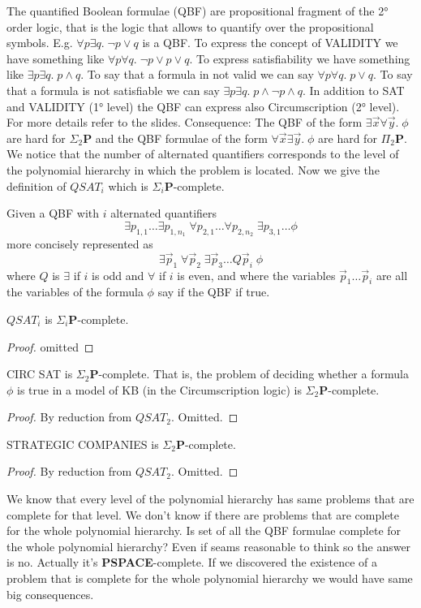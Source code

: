 The quantified Boolean formulae (QBF) are propositional fragment of the 2° order logic, that is the logic that allows to quantify over the propositional symbols. E.g. $\forall p \exists q.\; \neg p\lor q$ is a QBF. To express the concept of VALIDITY we have something like $\forall p\forall q.\;\neg p\lor p\lor q$. To express satisfiability we have something like $\exists p\exists q.\; p\land q$. To say that a formula in not valid we can say $\forall p\forall q.\; p\lor q$. To say that a formula is not satisfiable we can say $\exists p\exists q.\; p\land \neg p\land q$. In addition to SAT and VALIDITY (1° level) the QBF can express also Circumscription (2° level). For more details refer to the slides. Consequence: The QBF of the form $\exists \vec{x}\forall \vec{y}.\; \phi$ are hard for $\Sigma_2\mathbf{P}$ and the QBF formulae of the form $\forall \vec{x}\exists \vec{y}.\; \phi$ are hard for $\Pi_2\mathbf{P}$. We notice that the number of alternated quantifiers corresponds to the level of the polynomial hierarchy in which the problem is located. Now we give the definition of $QSAT_i$ which is $\Sigma_i\mathbf{P}$-complete.\\
\begin{defbox}[$QSAT_i$]
    Given a QBF with $i$ alternated quantifiers
    \[
\exists p_{1,1} \dots \exists p_{1,n_1} \; \forall p_{2,1} \dots \forall p_{2,n_2} \; \exists p_{3,1} \dots \phi
\]
 more concisely represented as
 \[
\exists \vec{p}_1 \; \forall \vec{p}_2 \; \exists \vec{p}_3 \dots Q \vec{p}_i \; \phi
\]
where $Q$ is $\exists$ if $i$ is odd and $\forall$ if $i$ is even, and where the variables $\vec{p}_1\dots\vec{p}_i$ are all the variables of the formula $\phi$ say if the QBF if true.
\end{defbox}
\begin{defbox}[Theorem]
    $QSAT_i$ is $\Sigma_i\mathbf{P}$-complete.
\end{defbox}
\begin{proof}
omitted
\end{proof}
\begin{defbox}[Theorem]
    CIRC SAT is $\Sigma_2\mathbf{P}$-complete. That is, the problem of deciding whether a formula $\phi$ is true in a model of KB (in the Circumscription logic) is $\Sigma_2\mathbf{P}$-complete.
\end{defbox}
\begin{proof}
    By reduction from $QSAT_2$. Omitted.
\end{proof}
\begin{defbox}
    STRATEGIC COMPANIES is $\Sigma_2\mathbf{P}$-complete.
\end{defbox}
\begin{proof}
    By reduction from $QSAT_2$. Omitted.
\end{proof}
We know that every level of the polynomial hierarchy has same problems that are complete for that level. We don't know if there are problems that are complete for the whole polynomial hierarchy. Is set of all the QBF formulae complete for the whole polynomial hierarchy? Even if seams reasonable to think so the answer is no. Actually it's \textbf{PSPACE}-complete. If we discovered the existence of a problem that is complete for the whole polynomial hierarchy we would have same big consequences.
